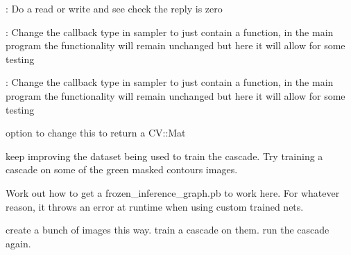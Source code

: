 
\begin{DoxyRefList}
\item[\label{todo__todo000008}%
\Hypertarget{todo__todo000008}%
Member \hyperlink{DriverSensorTest_8cpp_a0d54f5e177d12a6c804fa4396c287cae}{B\+O\+O\+S\+T\+\_\+\+A\+U\+T\+O\+\_\+\+T\+E\+S\+T\+\_\+\+C\+A\+SE} (I2\+C\+\_\+\+P\+L\+A\+I\+N\+\_\+\+W\+R\+I\+T\+E\+\_\+\+R\+E\+AD)]\+: Do a read or write and see check the reply is zero 
\item[\label{todo__todo000009}%
\Hypertarget{todo__todo000009}%
Member \hyperlink{IntegrationTests_8cpp_adc1d3c8e593faa9c35d22df377ba1a08}{B\+O\+O\+S\+T\+\_\+\+A\+U\+T\+O\+\_\+\+T\+E\+S\+T\+\_\+\+C\+A\+SE} (I2\+C\+\_\+\+S\+A\+M\+P\+L\+E\+R\+\_\+\+R\+E\+AD)]\+: Change the callback type in sampler to just contain a function, in the main program the functionality will remain unchanged but here it will allow for some testing 
\item[\label{todo__todo000010}%
\Hypertarget{todo__todo000010}%
Member \hyperlink{IntegrationTests_8cpp_aeb3242c69cc2b315f8e5e28c29b04392}{B\+O\+O\+S\+T\+\_\+\+A\+U\+T\+O\+\_\+\+T\+E\+S\+T\+\_\+\+C\+A\+SE} (C\+O\+N\+T\+R\+O\+L\+L\+E\+R\+\_\+\+O\+P\+E\+R\+A\+T\+I\+O\+N\+\_\+\+H\+A\+N\+D\+L\+E\+R\+\_\+\+F\+O\+R\+C\+E\+\_\+\+F\+L\+A\+GS)]\+: Change the callback type in sampler to just contain a function, in the main program the functionality will remain unchanged but here it will allow for some testing 
\item[\label{todo__todo000001}%
\Hypertarget{todo__todo000001}%
Member \hyperlink{classCamera_a07670e99337fb322375a412222c06ada}{Camera\+:\+:take\+Picture} ()]option to change this to return a C\+V\+::\+Mat  
\item[\label{todo__todo000003}%
\Hypertarget{todo__todo000003}%
Member \hyperlink{classCamera_a09931f84cc8e66e4e4c1181cb1cb4af6}{Camera\+:\+:take\+Scan\+Cascade} ()]keep improving the dataset being used to train the cascade. Try training a cascade on some of the green masked contours images.  
\item[\label{todo__todo000002}%
\Hypertarget{todo__todo000002}%
Member \hyperlink{classCamera_a59f08842d3de300419c74b12bee44d47}{Camera\+:\+:take\+Scan\+D\+N\+N\+Picture} ()]Work out how to get a frozen\+\_\+inference\+\_\+graph.\+pb to work here. For whatever reason, it throws an error at runtime when using custom trained nets.  
\item[\label{todo__todo000004}%
\Hypertarget{todo__todo000004}%
Member \hyperlink{classCamera_ab4f4c3f77479c8594dfa7fd7e6348306}{Camera\+:\+:take\+Scan\+For\+Green} ()]create a bunch of images this way. train a cascade on them. run the cascade again.  

\end{DoxyRefList}
